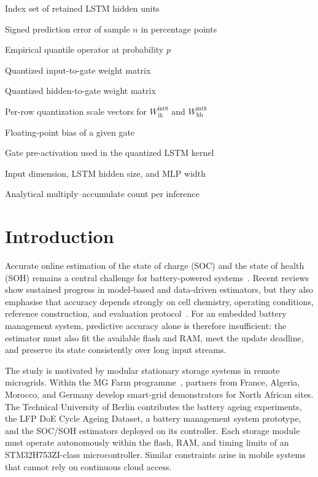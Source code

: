 \documentclass[review]{elsarticle}
\begin{document}
\begin{description}[style=multiline,leftmargin=1.5cm,font=\bfseries]
\item[$\mathcal{R}$] Index set of retained LSTM hidden units
\item[$e_n$] Signed prediction error of sample $n$ in percentage points
\item[$Q_p(\cdot)$] Empirical quantile operator at probability $p$
\item[$W_{\mathrm{ih}}^{\mathrm{int8}}$] Quantized input-to-gate weight matrix
\item[$W_{\mathrm{hh}}^{\mathrm{int8}}$] Quantized hidden-to-gate weight matrix
\item[$s_{\mathrm{ih}}, s_{\mathrm{hh}}$] Per-row quantization scale vectors for $W_{\mathrm{ih}}^{\mathrm{int8}}$ and $W_{\mathrm{hh}}^{\mathrm{int8}}$
\item[$b_{\mathrm{fp32}}$] Floating-point bias of a given gate
\item[$g$] Gate pre-activation used in the quantized LSTM kernel
\item[$D,H,M$] Input dimension, LSTM hidden size, and MLP width
\item[$N_{\mathrm{MAC}}$] Analytical multiply--accumulate count per inference
\end{description}
\normalsize
\section{Introduction}
Accurate online estimation of the state of charge (SOC) and the state of health (SOH) remains a central challenge for battery-powered systems~\cite{yaoSmarterBatteryManagement2025a,a.m.s.m.h.s.attanayakaEstimationStateCharge2019,berecibarCriticalReviewState2016,shrivastavaReviewTechnologicalAdvancement2023}. Recent reviews show sustained progress in model-based and data-driven estimators, but they also emphasise that accuracy depends strongly on cell chemistry, operating conditions, reference construction, and evaluation protocol~\cite{guoSystematicReviewElectrochemical2024,yaoSmarterBatteryManagement2025a}. For an embedded battery management system, predictive accuracy alone is therefore insufficient: the estimator must also fit the available flash and RAM, meet the update deadline, and preserve its state consistently over long input streams.

The study is motivated by modular stationary storage systems in remote microgrids. Within the MG Farm programme~\cite{leap-reMGFARMSmart,microenergyMGFARMPoweringSustainable,aqachtoulMGFARMIoTEdgeDriven2026,technischeuniversitatberlinMGFarmSmart}, partners from France, Algeria, Morocco, and Germany develop smart-grid demonstrators for North African sites. The Technical University of Berlin contributes the battery ageing experiments, the LFP DoE Cycle Ageing Dataset, a battery management system prototype, and the SOC/SOH estimators deployed on its controller. Each storage module must operate autonomously within the flash, RAM, and timing limits of an STM32H753ZI-class microcontroller. Similar constraints arise in mobile systems that cannot rely on continuous cloud access.
\end{document}
